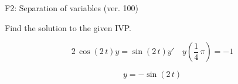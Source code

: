 \begin{exercise}
  \begin{exerciseTitle}F2: Separation of variables (ver. 100)\end{exerciseTitle}
  \begin{exerciseStatement}
    
Find the solution to the given IVP.

    
\[2 \, \cos\left(2 \, t\right) y= \sin\left(2 \, t\right) y'\hspace{1em} y\left( \frac{1}{4} \, \pi \right)= -1\]

  \end{exerciseStatement}
  \begin{exerciseAnswer}
    
\[y= -\sin\left(2 \, t\right)\]

  \end{exerciseAnswer}
\end{exercise}